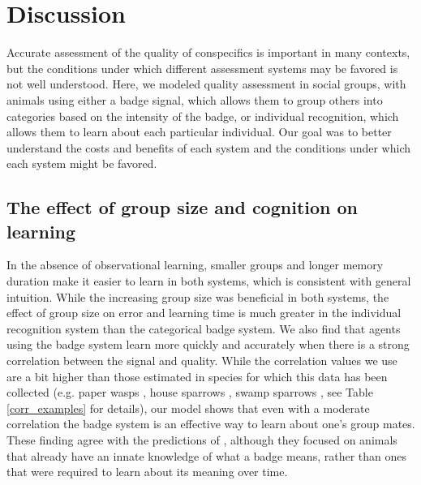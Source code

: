 \section*{Discussion}
Accurate assessment of the quality of conspecifics is important in many contexts, but the conditions under which different assessment systems may be favored is not well understood. Here, we modeled quality assessment in social groups, with animals using either a badge signal, which allows them to group others into categories based on the intensity of the badge, or individual recognition, which allows them to learn about each particular individual. Our goal was to better understand the costs and benefits of each system and the conditions under which each system might be favored. 

\subsection*{The effect of group size and cognition on learning} 

In the absence of observational learning, smaller groups and longer memory duration make it easier to learn in both systems, which is consistent with general intuition. While the increasing group size was beneficial in both systems, the effect of group size on error and learning time is much greater in the individual recognition system than the categorical badge system. We also find that agents using the badge system learn more quickly and accurately when there is a strong correlation between the signal and quality. While the correlation values we use are a bit higher than those estimated in species for which this data has been collected (e.g. paper wasps \citep{Tibbetts:2004kx}, house sparrows \citep{Veiga:1993fk}, swamp sparrows \citep{Olsen:2010uq}, see Table \ref{corr_examples} for details), our model shows that even with a moderate correlation the badge system is an effective way to learn about one's group mates. These finding agree with the predictions of \citet{sheehan2016evotradeoff}, although they focused on animals that already have an innate knowledge of what a badge means, rather than ones that were required to learn about its meaning over time.

